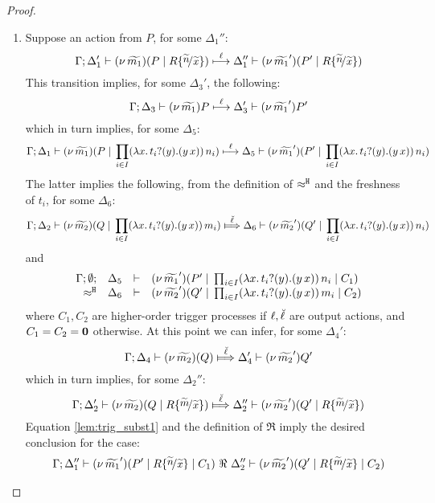 \begin{proof}
	\begin{enumerate}
		\item	Suppose an action from $P$, for some $\Delta_1''$:
		\[
					\horel{\Gamma}{\Delta_1'}{\newsp{\widetilde{m_1}}{P \Par R \subst{\widetilde{n}}{\widetilde{x}} }}
					{\hby{\ell}}
					{\Delta_1''}{\newsp{\widetilde{m_1}'}{P' \Par R \subst{\widetilde{n}}{\widetilde{x}} }}
				\]
				This transition implies, for some $\Delta_3'$, the following:
				\[
					\Gamma; \Delta_3 \vdash (\nu\, \widetilde{m_1}){P} \stackrel{\ell}{\longmapsto} \Delta_3' \vdash (\nu\, \widetilde{m_1}'){P'}
				\]
				which in turn implies, for some $\Delta_5$:
				\[
					\Gamma; \Delta_1 \vdash (\nu\, \widetilde{m_1})(P \;|\; \prod_{i \in I} (\lambda x.\,t_i ? (y) . (y\, {x}))\, {n_i} ) \stackrel{\ell}{\longmapsto} \Delta_5 \vdash (\nu\, \widetilde{m_1}')(P' \;|\; \prod_{i \in I} (\lambda x.\,t_i ? (y) . (y\, {x}))\, {n_i} )
				\]
				The latter implies the following, from the definition of $\approx^\mathtt{H}$ and the
				freshness of $t_i$, for some $\Delta_6$:
				\[
					\horel{\Gamma}{\Delta_2}{\newsp{\widetilde{m_2}}{Q \Par \prod_{i \in I} \appl{(\trvalx{t_i})}{m_i} }}
					{\Hby{\mact{\ell}}}
					{\Delta_6}{\newsp{\widetilde{m_2}'}{Q' \Par \prod_{i \in I} \appl{(\trvalx{t_i})}{n_i} }}
				\]
				and
				\begin{eqnarray}
					\begin{array}{rcll} \Gamma; \emptyset; &\Delta_5& \vdash& (\nu\, \widetilde{m_1}')(P' \;|\; \prod_{i \in I} (\lambda x.\,t_i ? (y) . (y\, {x}))\, {n_i} \;|\; C_1)\\ \approx^\mathtt{H} &\Delta_6& \vdash &  (\nu\, \widetilde{m_2}')(Q' \;|\; \prod_{i \in I} (\lambda x.\,t_i ? (y) . (y\, {x}))\, {m_i} \;|\; C_2) \end{array}
					\label{lem:trig_subst1}
				\end{eqnarray}
				where $C_1, C_2$ are higher-order trigger processes if $\ell, \breve{\ell}$ are output actions,
				and $C_1 = C_2 = \mathbf{0}$ otherwise.
				At this point we can infer, for some $\Delta_4'$:
				\[
					\horel{\Gamma}{\Delta_4}{\newsp{\widetilde{m_2}}{Q }}
					{\Hby{\mact{\ell}}}
					{\Delta_4'}{\news{\widetilde{m_2}'}{Q'}}
				\]
				which in turn implies, for some $\Delta_2''$:
				\[
					\horel{\Gamma}{\Delta_2'}{\newsp{\widetilde{m_2}}{Q \Par R \subst{\widetilde{m}}{\widetilde{x}}}}
					{\Hby{\mact{\ell}}}
					{\Delta_2''}{\newsp{\widetilde{m_2}'}{Q' \Par R\subst{\widetilde{m}}{\widetilde{x}} }}
				\]
				Equation \eqref{lem:trig_subst1} and the definition of $\Re$ imply the desired conclusion for the case:
				\begin{eqnarray*}
					\horel{\Gamma}{\Delta_1''}{\newsp{\widetilde{m_1}'}{P' \Par R \subst{\widetilde{n}}{\widetilde{x}} \Par C_1}}
					{\ \Re\ }
					{\Delta_2''}{\newsp{\widetilde{m_2}'}{Q' \Par R \subst{\widetilde{m}}{\widetilde{x}} \Par C_2 }}

\end{eqnarray*}
\end{enumerate}
\end{proof}
